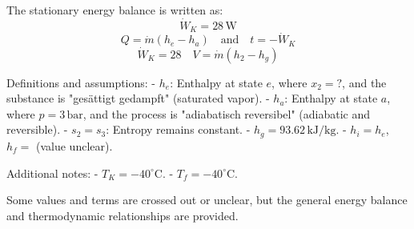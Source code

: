 The stationary energy balance is written as:  
\[
\dot{W}_K = 28 \, \text{W}
\]  
\[
Q = \dot{m} (h_e - h_a) \quad \text{and} \quad t = -\dot{W}_K
\]  
\[
\dot{W}_K = 28 \quad V = \dot{m} (h_2 - h_g)
\]  

Definitions and assumptions:  
- \( h_e \): Enthalpy at state \( e \), where \( x_2 = ? \), and the substance is "gesättigt gedampft" (saturated vapor).  
- \( h_a \): Enthalpy at state \( a \), where \( p = 3 \, \text{bar} \), and the process is "adiabatisch reversibel" (adiabatic and reversible).  
- \( s_2 = s_3 \): Entropy remains constant.  
- \( h_g = 93.62 \, \text{kJ/kg} \).  
- \( h_i = h_e \), \( h_f = \) (value unclear).  

Additional notes:  
- \( T_K = -40^\circ\text{C} \).  
- \( T_f = -40^\circ\text{C} \).  

Some values and terms are crossed out or unclear, but the general energy balance and thermodynamic relationships are provided.